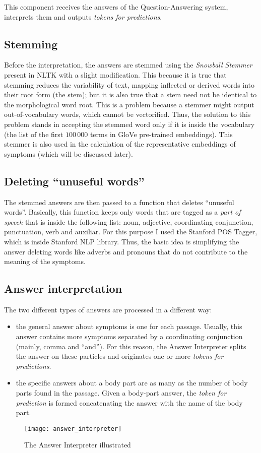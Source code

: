 This component receives the answers of the Question-Answering system, interprets them and outputs \textit{tokens for predictions}.
\subsection{Stemming}
\label{sec:stemming}
Before the interpretation, the answers are stemmed using the \textit{Snowball Stemmer} present in NLTK with a slight modification. This because it is true that stemming reduces the variability of text, mapping inflected or derived words into their root form (the stem); but it is also true that a stem need not be identical to the morphological word root. This is a problem because a stemmer might output out-of-vocabulary words, which cannot be vectorified. Thus, the solution to this problem stands in accepting the stemmed word only if it is inside the vocabulary (the list of the first $100\,000$ terms in GloVe pre-trained embeddings). This stemmer is also used in the calculation of the representative embeddings of symptoms (which will be discussed later).

\subsection{Deleting ``unuseful words''}
The stemmed answers are then passed to a function that deletes ``unuseful words''. Basically, this function keeps only words that are tagged as a \textit{part of speech} that is inside the following list: noun, adjective, coordinating conjunction, punctuation, verb and auxiliar. For this purpose I used the Stanford POS Tagger, which is inside Stanford NLP library. Thus, the basic idea is simplifying the answer deleting words like adverbs and pronouns that do not contribute to the meaning of the symptoms.

\subsection{Answer interpretation}
The two different types of answers are processed in a different way:
\begin{itemize}
  \item the general answer about symptoms is one for each passage. Usually, this answer contains more symptoms separated by a coordinating conjunction (mainly, comma and ``and''). For this reason, the Answer Interpreter splits the answer on these particles and originates one or more \textit{tokens for predictions}.
  \item the specific answers about a body part are as many as the number of body parts found in the passage. Given a body-part answer, the \textit{token for prediction} is formed concatenating the answer with the name of the body part.
\end{itemize}

\begin{figure}[h]
\centering
\texttt{[image: answer\_interpreter]}
\caption{The Answer Interpreter illustrated}
\medskip
\label{fig:answer_int}
\end{figure}

